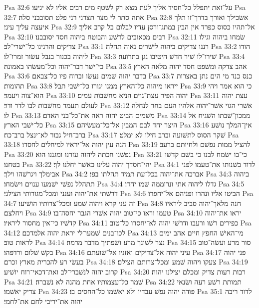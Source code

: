 Psa 32:6  על־זאת יתפלל כל־חסיד אליך לעת מצא רק לשׁטף מים רבים אליו לא יגיעו׃
Psa 32:7  אתה סתר לי מצר תצרני רני פלט תסובבני סלה׃
Psa 32:8  אשׂכילך ואורך בדרך־זו תלך איעצה עליך עיני׃
Psa 32:9  אל־תהיו כסוס כפרד אין הבין במתג־ורסן עדיו לבלום בל קרב אליך׃
Psa 32:10  רבים מכאובים לרשׁע והבוטח ביהוה חסד יסובבנו׃
Psa 32:11  שׂמחו ביהוה וגילו צדיקים והרנינו כל־ישׁרי־לב׃
Psa 33:1  רננו צדיקים ביהוה לישׁרים נאוה תהלה׃
Psa 33:2  הודו ליהוה בכנור בנבל עשׂור זמרו־לו׃
Psa 33:3  שׁירו־לו שׁיר חדשׁ היטיבו נגן בתרועה׃
Psa 33:4  כי־ישׁר דבר־יהוה וכל־מעשׂהו באמונה׃
Psa 33:5  אהב צדקה ומשׁפט חסד יהוה מלאה הארץ׃
Psa 33:6  בדבר יהוה שׁמים נעשׂו וברוח פיו כל־צבאם׃
Psa 33:7  כנס כנד מי הים נתן באצרות תהומות׃
Psa 33:8  ייראו מיהוה כל־הארץ ממנו יגורו כל־ישׁבי תבל׃
Psa 33:9  כי הוא אמר ויהי הוא־צוה ויעמד׃
Psa 33:10  יהוה הפיר עצת־גוים הניא מחשׁבות עמים׃
Psa 33:11  עצת יהוה לעולם תעמד מחשׁבות לבו לדר ודר׃
Psa 33:12  אשׁרי הגוי אשׁר־יהוה אלהיו העם בחר לנחלה לו׃
Psa 33:13  משׁמים הביט יהוה ראה את־כל־בני האדם׃
Psa 33:14  ממכון־שׁבתו השׁגיח אל כל־ישׁבי הארץ׃
Psa 33:15  היצר יחד לבם המבין אל־כל־מעשׂיהם׃
Psa 33:16  אין־המלך נושׁע ברב־חיל גבור לא־ינצל ברב־כח׃
Psa 33:17  שׁקר הסוס לתשׁועה וברב חילו לא ימלט׃
Psa 33:18  הנה עין יהוה אל־יראיו למיחלים לחסדו׃
Psa 33:19  להציל ממות נפשׁם ולחיותם ברעב׃
Psa 33:20  נפשׁנו חכתה ליהוה עזרנו ומגננו הוא׃
Psa 33:21  כי־בו ישׂמח לבנו כי בשׁם קדשׁו בטחנו׃
Psa 33:22  יהי־חסדך יהוה עלינו כאשׁר יחלנו לך׃
Psa 34:1  לדוד בשׁנותו את־טעמו לפני אבימלך ויגרשׁהו וילך׃
Psa 34:2  אברכה את־יהוה בכל־עת תמיד תהלתו בפי׃
Psa 34:3  ביהוה תתהלל נפשׁי ישׁמעו ענוים וישׂמחו׃
Psa 34:4  גדלו ליהוה אתי ונרוממה שׁמו יחדו׃
Psa 34:5  דרשׁתי את־יהוה וענני ומכל־מגורותי הצילני׃
Psa 34:6  הביטו אליו ונהרו ופניהם אל־יחפרו׃
Psa 34:7  זה עני קרא ויהוה שׁמע ומכל־צרותיו הושׁיעו׃
Psa 34:8  חנה מלאך־יהוה סביב ליראיו ויחלצם׃
Psa 34:9  טעמו וראו כי־טוב יהוה אשׁרי הגבר יחסה־בו׃
Psa 34:10  יראו את־יהוה קדשׁיו כי־אין מחסור ליראיו׃
Psa 34:11  כפירים רשׁו ורעבו ודרשׁי יהוה לא־יחסרו כל־טוב׃
Psa 34:12  לכו־בנים שׁמעו־לי יראת יהוה אלמדכם׃
Psa 34:13  מי־האישׁ החפץ חיים אהב ימים לראות טוב׃
Psa 34:14  נצר לשׁונך מרע ושׂפתיך מדבר מרמה׃
Psa 34:15  סור מרע ועשׂה־טוב בקשׁ שׁלום ורדפהו׃
Psa 34:16  עיני יהוה אל־צדיקים ואזניו אל־שׁועתם׃
Psa 34:17  פני יהוה בעשׂי רע להכרית מארץ זכרם׃
Psa 34:18  צעקו ויהוה שׁמע ומכל־צרותם הצילם׃
Psa 34:19  קרוב יהוה לנשׁברי־לב ואת־דכאי־רוח יושׁיע׃
Psa 34:20  רבות רעות צדיק ומכלם יצילנו יהוה׃
Psa 34:21  שׁמר כל־עצמותיו אחת מהנה לא נשׁברה׃
Psa 34:22  תמותת רשׁע רעה ושׂנאי צדיק יאשׁמו׃
Psa 34:23  פודה יהוה נפשׁ עבדיו ולא יאשׁמו כל־החסים בו׃
Psa 35:1  לדוד ריבה יהוה את־יריבי לחם את־לחמי׃
